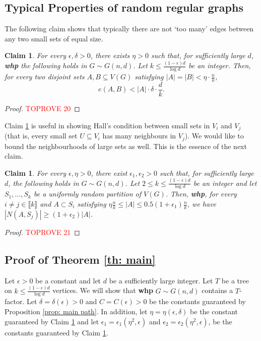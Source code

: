 \documentclass[notitlepage]{scrartcl}
\newcommand{\br}[1]{\llbracket{#1}\rrbracket}
\newtheorem{claim}[thm]{Claim}
\begin{document}
\subsection{Typical Properties of random regular graphs}\label{subsection:typical-properties}
The following claim shows that typically there are not `too many' edges between any two small sets of equal size. 
\begin{claim}\label{claim:global-event-between-small-sets}
    For every $\epsilon, \delta > 0$, there exists $\eta > 0$ such that, for sufficiently large $d$, \textbf{whp} the following holds in $G\sim G(n, d)$. Let $k \le \frac{(1-\epsilon)d}{\log d}$ be an integer. Then, for every two disjoint sets $A,B\subseteq V(G)$ satisfying $|A| = |B| < \eta \cdot \frac{n}{k}$,
    \[
        e(A, B) < |A| \cdot \delta \cdot \frac{d}{k}.
    \]    
\end{claim}
\begin{proof}\textcolor{red}{TOPROVE 20}\end{proof}

Claim \ref{claim:global-event-between-small-sets} is useful in showing Hall's condition between small sets in $V_i$ and $V_j$ (that is, every small set $U \subseteq V_i$ has many neighbours in $V_j$). We would like to bound the neighbourhoods of large sets as well. This is the essence of the next claim.

\begin{claim}\label{claim:typical neighbourhood-S}      
    For every $\epsilon, \eta > 0$, there exist $\epsilon_1, \epsilon_2 > 0$ such that, for sufficiently large $d$, the following holds in $G \sim G(n, d)$. Let $2\le k \le \frac{(1-\epsilon)d}{\log d}$ be an integer and let $S_1,\ldots, S_k$ be a uniformly random partition of $V(G)$. Then, \textbf{whp}, for every $i \neq j \in \br{k}$ and $A \subset S_i$ satisfying  $\eta \frac{n}{k} \le |A| \le 0.5(1 + \epsilon_1)\frac{n}{k}$, we have
    $|N(A, S_j)| \ge (1 + \epsilon_2) |A|$.    
\end{claim}
\begin{proof}\textcolor{red}{TOPROVE 21}\end{proof}

\subsection{Proof of Theorem \ref{th: main}}\label{subsection:proof-of-main-thm}
Let $\epsilon > 0$ be a constant and let $d$ be a sufficiently large integer. Let $T$ be a tree on $k\le \frac{(1-\epsilon)d}{\log d}$ vertices. We will show that \textbf{whp} $G \sim G(n, d)$ contains a $T$-factor. Let $\delta = \delta(\epsilon) > 0$ and $C = C(\epsilon) > 0$ be the constants guaranteed by Proposition \ref{prop: main path}. In addition, let $\eta = \eta(\epsilon, \delta)$ be the constant guaranteed by Claim \ref{claim:global-event-between-small-sets} and let $\epsilon_1 = \epsilon_1(\eta^2,\epsilon)$ and $\epsilon_2 = \epsilon_2(\eta^2,\epsilon)$, be the constants guaranteed by Claim \ref{claim:typical neighbourhood-S}.
\end{document}
